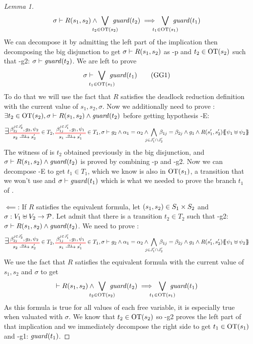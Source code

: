 \documentclass{article}
\begin{document}
\begin{proof}[Lemma 1]
	\[ \sigma \vdash R\mpar{s_1, s_2} \wedge \bigvee_\subbox{t_2 \in \fOT{s_2}} \fguard{t_2} \implies \bigvee_\subbox{t_1 \in \fOT{s_1}} \fguard{t_1} \]
	We can decompose it by admitting the left part of the implication then decomposing the big disjunction to get \(\sigma \vdash R{\left(s_1, s_2\right)}\) as \hyp{p} and \(t_2 \in \mathrm{OT}{\left(s_2\right)}\) such that \hyp{g2}: \(\sigma \vdash \mathit{guard}{\left(t_2\right)}\).
	We are left to prove \[ \sigma \vdash \bigvee_\subbox{t_1 \in \fOT{s_1}} \fguard{t_1} \goal{G1} \]
	To do that we will use the fact that \(R\) satisfies the deadlock reduction definition with the current value of \(s_1, s_2, \sigma\).
	Now we additionally need to prove : \(\exists t_2 \in \mathrm{OT}{\left(s_2\right)}, \sigma \vdash R{\left(s_1, s_2\right)} \wedge \mathit{guard}{\left(t_2\right)}\) before getting hypothesis \hyp{E}:
	\[ \bigsymb{\exists} \OTx{2}{}{2}{2} \in T_2, \OTx{1}{}{1}{1} \in T_1, \sigma \vdash g_2 \wedge \alpha_1 = \alpha_2 \wedge \bigwedge_\subbox{j \in J'_1 \cap J'_2} \beta_{1j} = \beta_{2j} \wedge g_1 \wedge R\mpar{s'_1, s'_2}\psubst{\psi_1 \uplus \psi_2} \]
	The witness of  is \(t_2\) obtained previously in the big disjunction, and \(\sigma \vdash R{\left(s_1, s_2\right)} \wedge \mathit{guard}{\left(t_2\right)}\) is proved by combining \hyp{p} and \hyp{g2}.
	Now we can decompose \hyp{E} to get \(t_1 \in T_1\), which we know is also in \(\mathrm{OT}{\left(s_1\right)}\), a transition that we won't use and \(\sigma \vdash \mathit{guard}{\left(t_1\right)}\) which is what we needed to prove the branch \(t_1\) of .
\item[\(\impliedby\):] If \(R\) satisfies the equivalent formula, let \({\left(s_1, s_2\right)} \in S_1 \times S_2\) and \(\sigma: V_1 \uplus V_2 \to \mathcal{P}\).
	Let admit that there is a transition \(t_2 \in T_2\) such that \hyp{g2}: \(\sigma \vdash R{\left(s_1, s_2\right)} \wedge \mathit{guard}{\left(t_2\right)}\).
	We need to prove :
	\[ \bigsymb{\exists} \OTx{2}{}{2}{2} \in T_2, \OTx{1}{}{1}{1} \in T_1, \sigma \vdash g_2 \wedge \alpha_1 = \alpha_2 \wedge \bigwedge_\subbox{j \in J'_1 \cap J'_2} \beta_{1j} = \beta_{2j} \wedge g_1 \wedge R\mpar{s'_1, s'_2}\psubst{\psi_1 \uplus \psi_2} \]
	We use the fact that \(R\) satisfies the equivalent formula with the current value of \(s_1, s_2\) and \(\sigma\) to get
	\[ \vdash R\mpar{s_1, s_2} \wedge \bigvee_\subbox{t_2 \in \fOT{s_2}} \fguard{t_2} \implies \bigvee_\subbox{t_1 \in \fOT{s_1}} \fguard{t_1} \]
	As this formula is true for all values of each free variable, it is especially true when valuated with \(\sigma\).
	We know that \(t_2 \in \mathrm{OT}{\left(s_2\right)}\) so \hyp{g2} proves the left part of that implication and we immediately decompose the right side to get \(t_1 \in \mathrm{OT}{\left(s_1\right)}\) and \hyp{g1}: \(\mathit{guard}{\left(t_1\right)}\).


\end{proof}
\end{document}
